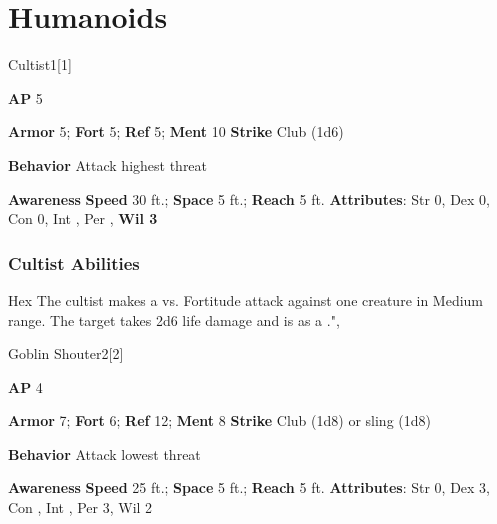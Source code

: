 \section{Humanoids}
\begin{monsection}{Cultist}{1}[1]
\vspace{-1em}\vspace{-1em}
\begin{spellcontent}
\begin{spelltargetinginfo}
{\textbf{AP} 5}

\pari \textbf{Armor} 5;
\textbf{Fort} 5;
\textbf{Ref} 5;
\textbf{Ment} 10
\pari \textbf{Strike} Club  (1d6)



\pari \textbf{Behavior} Attack highest threat
\end{spelltargetinginfo}
\end{spellcontent}

\begin{monsterfooter}
\pari \textbf{Awareness} 
\pari \textbf{Speed} 30 ft.;
\textbf{Space} 5 ft.;
\textbf{Reach} 5 ft.
\pari \textbf{Attributes}:
Str 0,
Dex 0,
Con 0,
Int ,
Per ,
\textbf{Wil 3}
\end{monsterfooter}
\end{monsection}


\subsubsection{Cultist Abilities}

\begin{freeability}{Hex}
The cultist makes a  vs. Fortitude attack against one creature in Medium range.
\hit The target takes 2d6 life damage and is  as a .",
\end{freeability}

\begin{monsection}{Goblin Shouter}{2}[2]
\vspace{-1em}\vspace{-1em}
\begin{spellcontent}
\begin{spelltargetinginfo}
{\textbf{AP} 4}

\pari \textbf{Armor} 7;
\textbf{Fort} 6;
\textbf{Ref} 12;
\textbf{Ment} 8
\pari \textbf{Strike} Club  (1d8) or sling  (1d8)



\pari \textbf{Behavior} Attack lowest threat
\end{spelltargetinginfo}
\end{spellcontent}

\begin{monsterfooter}
\pari \textbf{Awareness} 
\pari \textbf{Speed} 25 ft.;
\textbf{Space} 5 ft.;
\textbf{Reach} 5 ft.
\pari \textbf{Attributes}:
Str 0,
Dex 3,
Con ,
Int ,
Per 3,
Wil 2
\end{monsterfooter}
\end{monsection}


